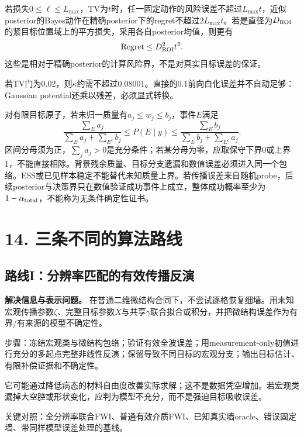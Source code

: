 \documentclass[
  10pt,
  a4paper,
]{article}
\begin{document}
若损失\(0\le\ell\le L_{\max}\)，TV为\(t\)时，任一固定动作的风险误差不超过\(L_{\max}t\)，近似posterior的Bayes动作在精确posterior下的regret不超过\(2L_{\max}t\)。若是直径为\(D_{\rm ROI}\)的紧目标位置域上的平方损失，采用各自posterior均值，则更有
\[
\operatorname{Regret}\le D_{\rm ROI}^2t^2.
\] 这些是相对于精确posterior的计算风险界，不是对真实目标误差的保证。

若TV门为0.02，则\(\kappa\)约需不超过0.08001。直接的0.1前向白化误差并不自动足够：Gaussian
potential还乘以残差，必须显式转换。

对有限目标原子，若未归一质量有\(a_j\le w_j\le b_j\)，事件\(E\)满足 \[
\frac{\sum_Ea_j}{\sum_Ea_j+\sum_{E^c}b_j}
\le P(E\mid y)\le
\frac{\sum_Eb_j}{\sum_Eb_j+\sum_{E^c}a_j}.
\]
区间分母须为正，\(\sum_j a_j>0\)是充分条件；若某分母为零，应取保守下界0或上界1，不能直接相除。背景残余质量、目标分支遗漏和数值误差必须进入同一个包络。ESS或已见样本稳定不能替代未知质量上界。若传播误差来自随机probe，后续posterior与决策界只在数值验证成功事件上成立，整体成功概率至少为\(1-\alpha_{\rm total}\)，不能称为无条件确定性证书。

\hypertarget{ux4e09ux6761ux4e0dux540cux7684ux7b97ux6cd5ux8defux7ebf}{%
\section{14.
三条不同的算法路线}\label{ux4e09ux6761ux4e0dux540cux7684ux7b97ux6cd5ux8defux7ebf}}

\hypertarget{ux8defux7ebfiux5206ux8fa8ux7387ux5339ux914dux7684ux6709ux6548ux4f20ux64adux53cdux6f14}{%
\subsection{路线I：分辨率匹配的有效传播反演}\label{ux8defux7ebfiux5206ux8fa8ux7387ux5339ux914dux7684ux6709ux6548ux4f20ux64adux53cdux6f14}}

\textbf{解决信息与表示问题。}
在普通二维微结构合同下，不尝试逐格恢复细墙。用未知宏观传播参数\(\zeta\)、完整目标参数\(X\)与共享\(\gamma\)联合拟合或积分，并把微结构误差作为有界/有来源的模型不确定性。

步骤：冻结宏观类与微结构包络；验证有效全波误差；用measurement-only初值进行充分的多起点完整非线性反演；保留导致不同目标的宏观分支；输出目标估计、有限补偿证据和不确定性。

它可能通过降低病态的材料自由度改善实际求解；这不是数据凭空增加。若宏观类漏掉大空腔或形状变化，应判为模型不充分，而不是强迫目标吸收误差。

关键对照：全分辨率联合FWI、普通有效介质FWI、已知真实墙oracle、错误固定墙、带同样模型误差处理的基线。
\end{document}
